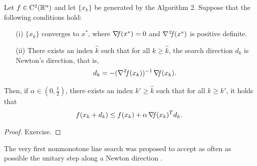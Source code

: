 \documentclass[10pt,a4paper]{article}
\begin{document}
\begin{proposition}
	Let $f\in\mathord{\mathrm{C^2}}(\mathbb{R}^n)$ and let $\{x_k\}$ be generated by the Algorithm 2. Suppose that the following conditions hold:
	\begin{itemize}
		\item[(i)] $\{x_k\}$ converges to $x^*$, where $\operatorname*{\mathit{\nabla \!f}}(x^*)=0$ and $\operatorname*{\mathit{\nabla^2 \!f}}(x^*)$ is positive definite.
		\item[(ii)] There exists an index $\hat{k}$ such that for all $k \geq \hat{k}$, the search direction $d_k$ is Newton's direction, that is,
		\begin{align*}
			d_k = -(\operatorname*{\mathit{\nabla^2 \!f}}(x_k))^{-1} \operatorname*{\mathit{\nabla \!f}}(x_k).
		\end{align*}
	\end{itemize}
	Then, if $\alpha \in \left(0,\frac{1}{2}\right)$, there exists an index $k' \geq \hat{k}$ such that for all $k\geq k'$, it holds that
	\begin{align*}
		f(x_k+d_k) \leq f(x_k)+ \alpha \operatorname*{\mathit{\nabla \!f}}(x_k)^T d_k.
	\end{align*}
\end{proposition}
\begin{proof}
	Exercise.
\end{proof}
\noindent The very first nonmonotone line search was proposed to accept as often as possible the unitary step along a Newton direction \cite{grippo86a}.
\end{document}
